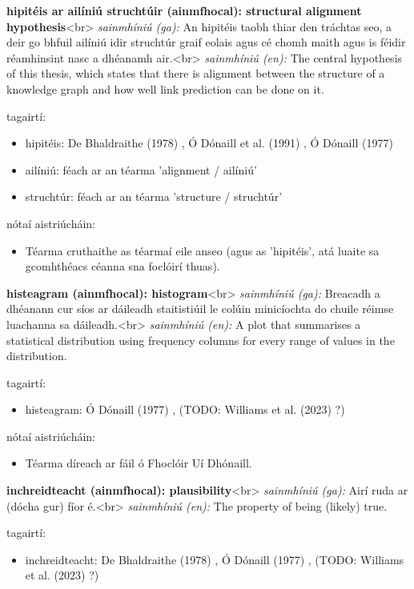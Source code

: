 \documentclass{article}
\begin{document}
\textbf{hipitéis ar ailíniú struchtúir (ainmfhocal): structural alignment hypothesis}<br>
\textit{sainmhíniú (ga):} An hipitéis taobh thiar den tráchtas seo, a deir go bhfuil ailíniú idir struchtúr graif eolais agus cé chomh maith agus is féidir réamhinsint nasc a dhéanamh air.<br>
\textit{sainmhíniú (en):} The central hypothesis of this thesis, which states that there is alignment between the structure of a knowledge graph and how well link prediction can be done on it.

tagairtí:
\begin{itemize}
	\item hipitéis: De Bhaldraithe (1978) \cite{de-bhaldraithe}, Ó Dónaill et al. (1991) \cite{focloir-beag}, Ó Dónaill (1977) \cite{odonaill}
	\item ailíniú: féach ar an téarma 'alignment / ailíniú'
	\item struchtúr: féach ar an téarma 'structure / struchtúr'
\end{itemize}

nótaí aistriúcháin:
\begin{itemize}
	\item Téarma cruthaithe as téarmaí eile anseo (agus as 'hipitéis', atá luaite sa gcomhthéacs céanna sna foclóirí thuas).
\end{itemize}


\textbf{histeagram (ainmfhocal): histogram}<br>
\textit{sainmhíniú (ga):} Breacadh a dhéanann cur síos ar dáileadh staitistiúil le colúin minicíochta do chuile réimse luachanna sa dáileadh.<br>
\textit{sainmhíniú (en):} A plot that summarises a statistical distribution using frequency columns for every range of values in the distribution.

tagairtí:
\begin{itemize}
	\item histeagram: Ó Dónaill (1977) \cite{odonaill}, (TODO: Williams et al. (2023) \cite{storchiste}?)
\end{itemize}

nótaí aistriúcháin:
\begin{itemize}
	\item Téarma díreach ar fáil ó Fhoclóir Uí Dhónaill.
\end{itemize}


\textbf{inchreidteacht (ainmfhocal): plausibility}<br>
\textit{sainmhíniú (ga):} Airí ruda ar (dócha gur) fíor é.<br>
\textit{sainmhíniú (en):} The property of being (likely) true.

tagairtí:
\begin{itemize}
	\item inchreidteacht: De Bhaldraithe (1978) \cite{de-bhaldraithe}, Ó Dónaill (1977) \cite{odonaill}, (TODO: Williams et al. (2023) \cite{storchiste}?)
\end{itemize}
\end{document}

